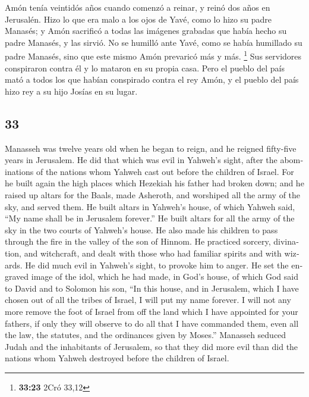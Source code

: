 \begin{paracol}{2}
 Amón tenía veintidós años cuando comenzó a reinar, y
reinó dos años en Jerusalén.  Hizo lo que era malo a los
ojos de Yavé, como lo hizo su padre Manasés; y Amón sacrificó a todas
las imágenes grabadas que había hecho su padre Manasés, y las sirvió.
 No se humilló ante Yavé, como se había humillado su
padre Manasés, sino que este mismo Amón prevaricó más y más. \footnote{\textbf{33:23}
  2Cró 33,12}  Sus servidores conspiraron contra él y lo
mataron en su propia casa.  Pero el pueblo del país mató
a todos los que habían conspirado contra el rey Amón, y el pueblo del
país hizo rey a su hijo Josías en su lugar.

\switchcolumn
\begin{otherlanguage}{english}

\hypertarget{section-65}{%
\section{33}\label{section-65}}

 Manasseh was twelve years old when he began to reign, and
he reigned fifty-five years in Jerusalem.  He did that
which was evil in Yahweh's sight, after the abominations of the nations
whom Yahweh cast out before the children of Israel.  For
he built again the high places which Hezekiah his father had broken
down; and he raised up altars for the Baals, made Asheroth, and
worshiped all the army of the sky, and served them.  He
built altars in Yahweh's house, of which Yahweh said, ``My name shall be
in Jerusalem forever.''  He built altars for all the army
of the sky in the two courts of Yahweh's house.  He also
made his children to pass through the fire in the valley of the son of
Hinnom. He practiced sorcery, divination, and witchcraft, and dealt with
those who had familiar spirits and with wizards. He did much evil in
Yahweh's sight, to provoke him to anger.  He set the
engraved image of the idol, which he had made, in God's house, of which
God said to David and to Solomon his son, ``In this house, and in
Jerusalem, which I have chosen out of all the tribes of Israel, I will
put my name forever.  I will not any more remove the foot
of Israel from off the land which I have appointed for your fathers, if
only they will observe to do all that I have commanded them, even all
the law, the statutes, and the ordinances given by Moses.''
 Manasseh seduced Judah and the inhabitants of Jerusalem,
so that they did more evil than did the nations whom Yahweh destroyed
before the children of Israel.


\end{otherlanguage}
\end{paracol}
